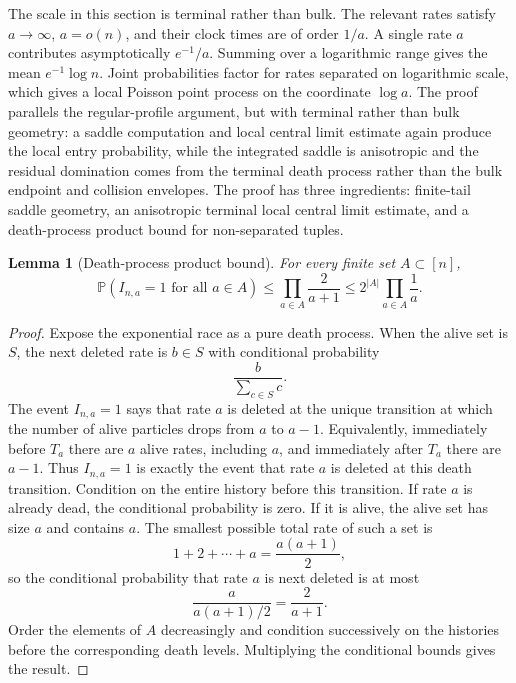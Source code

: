\documentclass[11pt]{article}
\newtheorem{lemma}[theorem]{Lemma}
\theoremstyle{remark}
\newcommand{\Pp}{\mathbb P}
\begin{document}
The scale in this section is terminal rather than bulk.  The relevant rates satisfy
\(a\to\infty\), \(a=o(n)\), and their clock times are of order \(1/a\).  A single rate \(a\) contributes asymptotically \(e^{-1}/a\).  Summing over a logarithmic range gives the mean \(e^{-1}\log n\).  Joint probabilities factor for rates separated on logarithmic scale, which gives a local Poisson point process on the coordinate \(\log a\).  The proof parallels the regular-profile argument, but with terminal rather than bulk geometry: a saddle computation and local central limit estimate again produce the local entry probability, while the integrated saddle is anisotropic and the residual domination comes from the terminal death process rather than the bulk endpoint and collision envelopes.  The proof has three ingredients: finite-tail saddle geometry, an anisotropic terminal local central limit estimate, and a death-process product bound for non-separated tuples.

\begin{lemma}[Death-process product bound]\label{lem:death-bound}
For every finite set \(A\subset[n]\),
\[
        \Pp(I_{n,a}=1\text{ for all }a\in A)
        \le \prod_{a\in A}\frac{2}{a+1}
        \le 2^{|A|}\prod_{a\in A}\frac1a .
\]
\end{lemma}

\begin{proof}
Expose the exponential race as a pure death process.  When the alive set is \(S\), the next deleted rate is \(b\in S\) with conditional probability
\[
        \frac{b}{\sum_{c\in S}c}.
\]
The event \(I_{n,a}=1\) says that rate \(a\) is deleted at the unique transition at which the number of alive particles drops from \(a\) to \(a-1\).  Equivalently, immediately before \(T_a\) there are \(a\) alive rates, including \(a\), and immediately after \(T_a\) there are \(a-1\).  Thus \(I_{n,a}=1\) is exactly the event that rate \(a\) is deleted at this death transition.  Condition on the entire history before this transition.  If rate \(a\) is already dead, the conditional probability is zero.  If it is alive, the alive set has size \(a\) and contains \(a\).  The smallest possible total rate of such a set is
\[
        1+2+\cdots+a=\frac{a(a+1)}2,
\]
so the conditional probability that rate \(a\) is next deleted is at most
\[
        \frac{a}{a(a+1)/2}=\frac{2}{a+1}.
\]
Order the elements of \(A\) decreasingly and condition successively on the histories before the corresponding death levels.  Multiplying the conditional bounds gives the result.
\end{proof}
\end{document}
